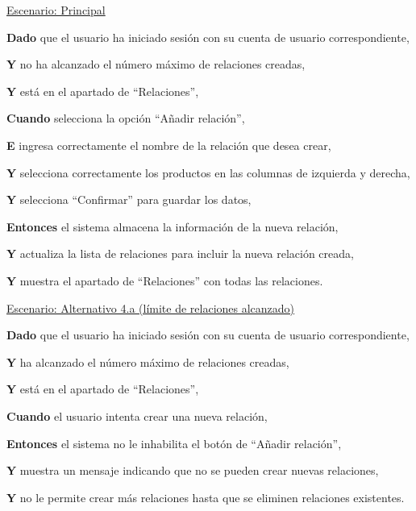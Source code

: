 \underline{Escenario: Principal}\par
\vspace{0.15cm}
\textbf{Dado} que el usuario ha iniciado sesión con su cuenta de usuario correspondiente,\par
\textbf{Y} no ha alcanzado el número máximo de relaciones creadas,\par
\textbf{Y} está en el apartado de \enquote{Relaciones},\par
\textbf{Cuando} selecciona la opción \enquote{Añadir relación},\par
\textbf{E} ingresa correctamente el nombre de la relación que desea crear,\par
\textbf{Y} selecciona correctamente los productos en las columnas de izquierda y derecha,\par
\textbf{Y} selecciona \enquote{Confirmar} para guardar los datos,\par
\textbf{Entonces} el sistema almacena la información de la nueva relación,\par
\textbf{Y} actualiza la lista de relaciones para incluir la nueva relación creada,\par
\textbf{Y} muestra el apartado de \enquote{Relaciones} con todas las relaciones.\par

\vspace{0.20cm}

\underline{Escenario: Alternativo 4.a (límite de relaciones alcanzado)}\par
\vspace{0.15cm}
\textbf{Dado} que el usuario ha iniciado sesión con su cuenta de usuario correspondiente,\par
\textbf{Y} ha alcanzado el número máximo de relaciones creadas,\par
\textbf{Y} está en el apartado de \enquote{Relaciones},\par
\textbf{Cuando} el usuario intenta crear una nueva relación,\par
\textbf{Entonces} el sistema no le inhabilita el botón de \enquote{Añadir relación},\par
\textbf{Y} muestra un mensaje indicando que no se pueden crear nuevas relaciones,\par
\textbf{Y} no le permite crear más relaciones hasta que se eliminen relaciones existentes.\par

\vspace{0.20cm}
\newpage %


